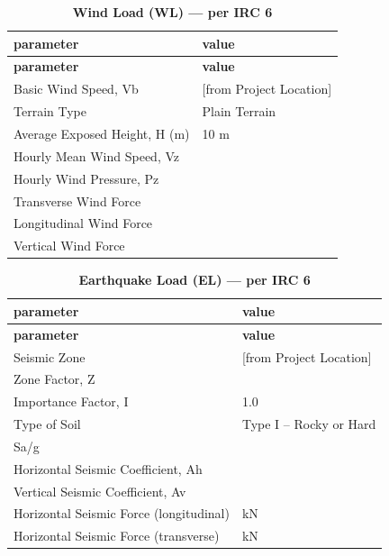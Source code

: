 \documentclass[12pt,a4paper]{report}
\numberwithin{table}{chapter}
\numberwithin{figure}{chapter}
\begin{document}
\vspace{1em}
\begin{longtable}{|L{5.5cm}|p{10.0cm}|}
\caption{\textbf{Wind Load (WL) --- per IRC 6}}
\hline
\textbf{parameter} & \textbf{value} \\
\hline
\endfirsthead
\textbf{parameter} & \textbf{value} \\
\hline
\endhead
\textnormal{Basic Wind Speed, Vb} &  [from Project Location] \\[6pt]
\hline
\textnormal{Terrain Type} & Plain Terrain \\[6pt]
\hline
\textnormal{Average Exposed Height, H (m)} & 10 m \\[6pt]
\hline
\textnormal{Hourly Mean Wind Speed, Vz} &  \\[6pt]
\hline
\textnormal{Hourly Wind Pressure, Pz} &  \\[6pt]
\hline
\textnormal{Transverse Wind Force} &  \\[6pt]
\hline
\textnormal{Longitudinal Wind Force} &  \\[6pt]
\hline
\textnormal{Vertical Wind Force} &  \\[6pt]
\hline
\end{longtable}

\vspace{1em}
\begin{longtable}{|L{5.5cm}|p{10.0cm}|}
\caption{\textbf{Earthquake Load (EL) --- per IRC 6}}
\hline
\textbf{parameter} & \textbf{value} \\
\hline
\endfirsthead
\textbf{parameter} & \textbf{value} \\
\hline
\endhead
\textnormal{Seismic Zone} &  [from Project Location] \\[6pt]
\hline
\textnormal{Zone Factor, Z} &  \\[6pt]
\hline
\textnormal{Importance Factor, I} & 1.0 \\[6pt]
\hline
\textnormal{Type of Soil} & Type I – Rocky or Hard \\[6pt]
\hline
\textnormal{Sa/g} &  \\[6pt]
\hline
\textnormal{Horizontal Seismic Coefficient, Ah} &  \\[6pt]
\hline
\textnormal{Vertical Seismic Coefficient, Av} &  \\[6pt]
\hline
\textnormal{Horizontal Seismic Force (longitudinal)} &  kN \\[6pt]
\hline
\textnormal{Horizontal Seismic Force (transverse)} &  kN \\[6pt]
\hline
\end{longtable}
\end{document}
